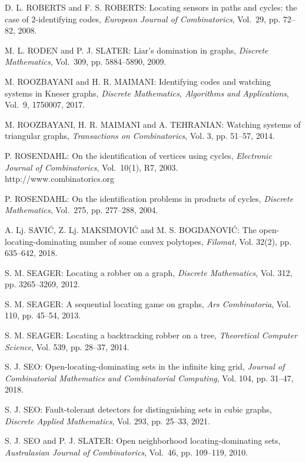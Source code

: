 \begin{thebibliography}{999}
D. L. ROBERTS and F. S. ROBERTS: Locating sensors in paths and cycles: the case of $2$-identifying codes, {\it European Journal of Combinatorics}, Vol.~29, pp. 72--82, 2008.

M. L. RODEN and P. J. SLATER: Liar's domination in graphs, {\it Discrete Mathematics}, Vol.~309, pp. 5884--5890, 2009.

M. ROOZBAYANI and H. R. MAIMANI: Identifying codes and watching systems in Kneser graphs, {\it Discrete Mathematics, Algorithms and Applications}, Vol.~9, 1750007, 2017.

M. ROOZBAYANI, H. R. MAIMANI and A. TEHRANIAN: Watching systems of triangular graphs, {\it Transactions on Combinatorics}, Vol. 3, pp. 51--57, 2014.

P. ROSENDAHL: On the identification of vertices using cycles, {\it Electronic Journal of Combinatorics}, Vol.~10(1), R7, 2003.\\
http://www.combinatorics.org

P. ROSENDAHL: On the identification problems in products of cycles, {\it Discrete Mathematics}, Vol.~275, pp. 277--288, 2004.

A. Lj. SAVI\'C, Z. Lj. MAKSIMOVI\'C and M. S. BOGDANOVI\'C: The open-locating-dominating number of some convex polytopes, {\it Filomat}, Vol. 32(2), pp. 635--642, 2018.

S. M. SEAGER: Locating a robber on a graph, {\it Discrete Mathematics}, Vol. 312, pp. 3265--3269, 2012.

S. M. SEAGER: A sequential locating game on graphs, {\it Ars Combinatoria}, Vol. 110, pp. 45--54, 2013.

S. M. SEAGER: Locating a backtracking robber on a tree, {\it Theoretical Computer Science}, Vol. 539, pp. 28--37, 2014.

S. J. SEO: Open-locating-dominating sets in the infinite king grid, {\it Journal of Combinatorial Mathematics and Combinatorial Computing}, Vol. 104, pp. 31--47, 2018.

S. J. SEO: Fault-tolerant detectors for distinguishing sets in cubic graphs, {\it Discrete Applied Mathematics}, Vol. 293, pp. 25--33, 2021.

S. J. SEO and P. J. SLATER: Open neighborhood locating-dominating sets, {\it Australasian Journal of Combinatorics}, Vol.~46, pp. 109--119, 2010.


\end{thebibliography}
